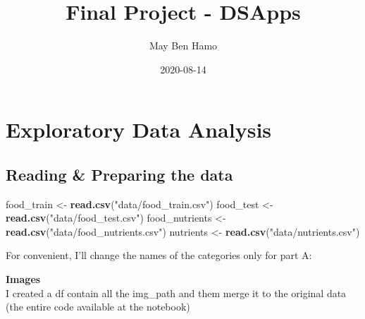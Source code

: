 \documentclass[
]{article}
\title{Final Project - DSApps}
\author{May Ben Hamo}
\date{2020-08-14}
\newenvironment{Shaded}{\begin{snugshade}}{\end{snugshade}}
\newcommand{\KeywordTok}[1]{\textcolor[rgb]{0.13,0.29,0.53}{\textbf{#1}}}
\newcommand{\NormalTok}[1]{#1}
\newcommand{\OperatorTok}[1]{\textcolor[rgb]{0.81,0.36,0.00}{\textbf{#1}}}
\newcommand{\StringTok}[1]{\textcolor[rgb]{0.31,0.60,0.02}{#1}}
\begin{document}
\maketitle

{
\setcounter{tocdepth}{3}
\tableofcontents
}
\newpage

\hypertarget{exploratory-data-analysis}{%
\section{Exploratory Data Analysis}\label{exploratory-data-analysis}}

\hypertarget{reading-preparing-the-data}{%
\subsection{Reading \& Preparing the
data}\label{reading-preparing-the-data}}

\begin{Shaded}
\begin{Highlighting}[]
\NormalTok{food_train <-}\StringTok{ }\KeywordTok{read.csv}\NormalTok{(}\StringTok{"data/food_train.csv"}\NormalTok{)}
\NormalTok{food_test <-}\StringTok{ }\KeywordTok{read.csv}\NormalTok{(}\StringTok{"data/food_test.csv"}\NormalTok{)}
\NormalTok{food_nutrients <-}\StringTok{ }\KeywordTok{read.csv}\NormalTok{(}\StringTok{"data/food_nutrients.csv"}\NormalTok{)}
\NormalTok{nutrients <-}\StringTok{ }\KeywordTok{read.csv}\NormalTok{(}\StringTok{"data/nutrients.csv"}\NormalTok{)}
\end{Highlighting}
\end{Shaded}

For convenient, I'll change the names of the categories only for part A:

\begin{Shaded}
\end{Shaded}

\textbf{Images}\\
I created a df contain all the img\_path and them merge it to the
original data (the entire code available at the notebook)
\end{document}
